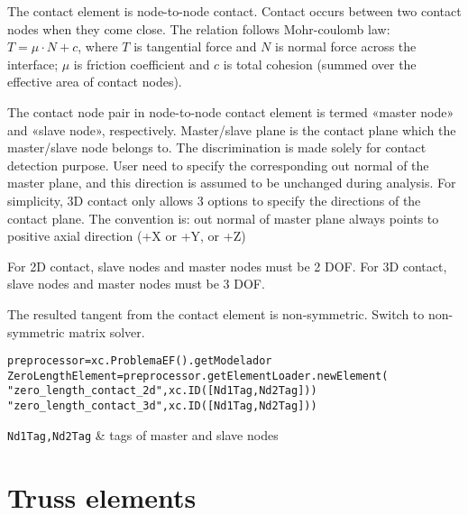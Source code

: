 The contact element is node-to-node contact. Contact occurs between two contact nodes when they come close. The relation follows Mohr-coulomb law: $T = \mu \cdot N + c$, where $T$ is tangential force and $N$ is normal force across the interface; $\mu$ is friction coefficient and $c$ is total cohesion (summed over the effective area of contact nodes).

The contact node pair in node-to-node contact element is termed «master node» and «slave node», respectively. Master/slave plane is the contact plane which the master/slave node belongs to. The discrimination is made solely for contact detection purpose. User need to specify the corresponding out normal of the master plane, and this direction is assumed to be unchanged during analysis. For simplicity, 3D contact only allows 3 options to specify the directions of the contact plane. The convention is: out normal of master plane always points to positive axial direction (+X or +Y, or +Z)

For 2D contact, slave nodes and master nodes must be 2 DOF. For 3D contact, slave nodes and master nodes must be 3 DOF.

The resulted tangent from the contact element is non-symmetric. Switch to non-symmetric matrix solver. 

\begin{verbatim}
preprocessor=xc.ProblemaEF().getModelador
ZeroLengthElement=preprocessor.getElementLoader.newElement(
"zero_length_contact_2d",xc.ID([Nd1Tag,Nd2Tag]))
"zero_length_contact_3d",xc.ID([Nd1Tag,Nd2Tag]))
\end{verbatim}
\begin{paramFuncTable}
{\tt Nd1Tag,Nd2Tag} & tags of master and slave nodes\\
\end{paramFuncTable}


\begin{paramClassTable}
\ElementParam{}
\ElementZERODParam{}
\end{paramClassTable}

\begin{methodsTable}
\ElementMeth{}
\ElementZERODMeth{}
\end{methodsTable}



\section{Truss elements}

